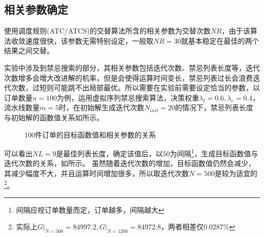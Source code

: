 \subsection{相关参数确定}
使用调度规则(ATC/ATCS)的交替算法所含的相关参数为交替次数$NR$，由于该算法收敛速度很快，该参数无需特别设定，一般取$NR = 30$就基本稳定在最佳的两个结果之间交替。

实验中涉及到禁忌搜索的部分，其相关参数包括迭代次数、禁忌列表长度等，迭代次数增多会增大改进解的机率，但是会使得运算时间变长，禁忌列表过长会浪费迭代次数，过短则可能跳不出局部最优。所以需要在实验前需要设定恰当的参数，以订单数量$n = 100$为例，运用虚拟序列禁忌搜索算法，决策权重$\lambda_t =0.6, \lambda_c = 0.4$，流水线数量$m = 5$时，在初始解生成迭代次数$N_{init} = 20$的情况下，禁忌列表长度与初始解的函数值关系如所示。
\begin{figure}[h]
\centering
\subfloat[禁忌列表长度]{\texttt{[image: NL\_100]}\label{fig:100NLwithGoal}}
\subfloat[迭代次数]{\texttt{[image: N\_100]}\label{fig:100NwithGoal}}
\caption{$100$件订单的目标函数值和相关参数的关系}
\end{figure}

可以看出$NL = 9$是最佳列表长度，确定该值后，以$50$为间隔\footnote{间隔应视订单数量而定，订单越多，间隔越大}，生成目标函数值与迭代次数的关系，如所示。
虽然随着迭代次数的增加，目标函数值仍然会减少，其减少幅度不大，并且运算时间增加很多，所以取迭代次数$N = 500$是较为适宜的\footnote{实际上$\left. G\right|_{N=500} = 84997.2, \left. G\right|_{N=1200} = 84972.8$，两者相差仅$0.0287\%$}。

